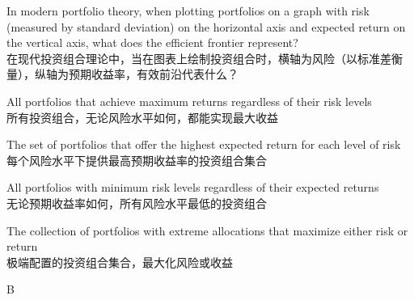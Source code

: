 \documentclass{article}
\newcounter{question} %
\begin{document}
\begin{question}
    In modern portfolio theory, when plotting portfolios on a graph with risk (measured by standard deviation) on the horizontal axis and expected return on the vertical axis, what does the efficient frontier represent?\\
    在现代投资组合理论中，当在图表上绘制投资组合时，横轴为风险（以标准差衡量），纵轴为预期收益率，有效前沿代表什么？
\end{question}

\begin{choices}
    \item All portfolios that achieve maximum returns regardless of their risk levels\\
    所有投资组合，无论风险水平如何，都能实现最大收益
    
    \item The set of portfolios that offer the highest expected return for each level of risk\\
    每个风险水平下提供最高预期收益率的投资组合集合
    
    \item All portfolios with minimum risk levels regardless of their expected returns\\
    无论预期收益率如何，所有风险水平最低的投资组合
    
    \item The collection of portfolios with extreme allocations that maximize either risk or return\\
    极端配置的投资组合集合，最大化风险或收益
\end{choices}

\begin{correctanswer}
    B
\end{correctanswer}
\end{document}
